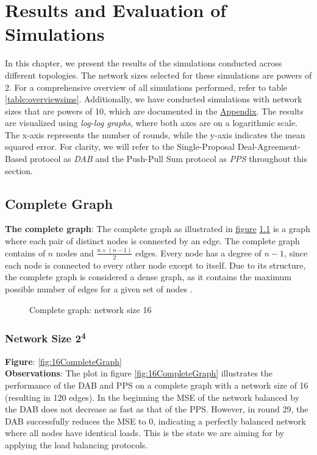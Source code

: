 \chapter{Results and Evaluation of Simulations}\label{chap:results}
In this chapter, we present the results of the simulations conducted across different topologies. The network sizes selected for these simulations are powers of 2. For a comprehensive overview of all simulations performed, refer to table \ref{table:overviewsims}. Additionally, we have conducted simulations with network sizes that are powers of 10, which are documented in the \hyperref[chap:appendix]{Appendix}.
The results are visualized using \textit{log-log graphs}, where both axes are on a logarithmic scale. The x-axis represents the number of rounds, while the y-axis indicates the mean squared error. For clarity, we will refer to the Single-Proposal Deal-Agreement-Based protocol as \textit{DAB} and the Push-Pull Sum protocol as \textit{PPS} throughout this section.

\section{Complete Graph}
\textbf{The complete graph}: The complete graph as illustrated in \hyperref[fig:completegraphDemo]{figure} \ref{fig:completegraphDemo} is a graph where each pair of distinct nodes is connected by an edge. The complete graph contains of $n$ nodes and $\frac{n\times(n-1)}{2}$ edges. Every node has a degree of $n-1$, since each node is connected to every other node except to itself. Due to its structure, the complete graph is considered a dense graph, as it contains the maximum possible number of edges for a given set of nodes \cite{GraphTheorySchindelhaauer2021}.
\begin{figure}[H]
    \centering
    
    \caption{Complete graph: network size 16}
    \label{fig:completegraphDemo}
\end{figure}
\subsection{Network Size 2\textsuperscript{4}}
\textbf{Figure}: \ref{fig:16CompleteGraph}\\
\textbf{Observations}: The plot in figure \ref{fig:16CompleteGraph} illustrates the performance of the DAB and PPS on a complete graph with a network size of 16 (resulting in 120 edges). In the beginning the MSE of the network balanced by the DAB does not decrease as fast as that of the PPS. However, in round 29, the DAB successfully reduces the MSE to 0, indicating a perfectly balanced network where all nodes have identical loads. This is the state we are aiming for by applying the load balancing protocols.

